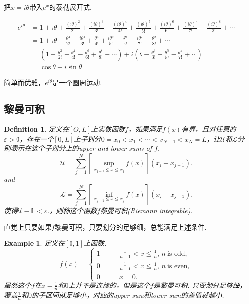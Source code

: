 \documentclass{article}
\newtheorem{example}[theorem]{Example}
\newtheorem{definition}[theorem]{Definition}
\begin{document}
把$x=i\theta$带入$e^x$的泰勒展开式.

\begin{equation}
\begin{aligned}
e^{i\theta } & = 1 + i\theta + \frac{(i\theta )^2}{2!} + \frac{(i\theta )^3}{3!} + \frac{(i\theta )^4}{4!} + \frac{(i\theta )^5}{5!} + \frac{(i\theta )^6}{6!} + \frac{(i\theta )^7}{7!} + \frac{(i\theta )^8}{8!} + \cdots \\ 
& = 1 + i\theta - \frac{\theta ^2}{2!} - \frac{i\theta ^3}{3!} + \frac{\theta ^4}{4!} + \frac{i\theta ^5}{5!} - \frac{\theta ^6}{6!} - \frac{i\theta ^7}{7!} + \frac{\theta ^8}{8!} + \cdots \\ 
& = \left( 1 - \frac{\theta ^2}{2!} + \frac{\theta ^4}{4!} - \frac{\theta ^6}{6!} + \frac{\theta ^8}{8!} - \cdots \right) + i\left(\theta -\frac{\theta ^3}{3!} + \frac{\theta ^5}{5!} - \frac{\theta ^7}{7!} + \cdots \right) \\ 
& = \cos \theta + i\sin \theta
\end{aligned}
\end{equation}

简单而优雅，$e^{i\theta}$是一个圆周运动.


\subsection{黎曼可积}

\begin{definition}
\rm 定义在$[O,L]$上实数函数$f$，如果满足$f(x)$有界，且对任意的$\varepsilon > 0$，存在一个$[0,L]$上子划分$0 = x_0 < x_1 < \cdots < x_{N-1} < x_N = L$，让$\mathcal{U}$和$\mathcal{L}$分别表示在这个子划分上的upper and lower sums of $f$. \[\mathcal{U} = \sum\limits_{j=1}^{N} \left[ \sup\limits_{x_{j-1} \leq x \leq x_{j}}f(x) \right] (x_j-x_{j-1}). \]and\[\mathcal{L} = \sum\limits_{j=1}^{N} \left[ \inf\limits_{x_{j-1} \leq x \leq x_{j}}f(x) \right] (x_j-x_{j-1}).\]使得$\mathcal{U} - \mathbb{L} < \varepsilon.$，则称这个函数$f$黎曼可积(Riemann integrable).
\end{definition}

直觉上只要如果$f$黎曼可积，只要划分的足够细，总能满足上述条件.

\begin{example}
\rm 定义在$[0,1]$上函数.
\begin{equation}
f(x)=\left\{
\begin{aligned}
1  &\qquad\frac{1}{n+1} < x \leq \frac{1}{n},\ n\ \text{is odd}, \\
0  &\qquad\frac{1}{n+1} < x \leq \frac{1}{n},\ n\ \text{is even}, \\
0  &\qquad x=0.
\end{aligned}
\right.
\end{equation}
虽然这个$f$在$x=\frac{1}{n}$和$0$上并不是连续的，但是这个$f$是黎曼可积. 只要划分足够细，覆盖$\frac{1}{n}$和$0$的子区间就足够小，对应的upper sum和lower sum的差值就越小.
\end{example}
\end{document}
